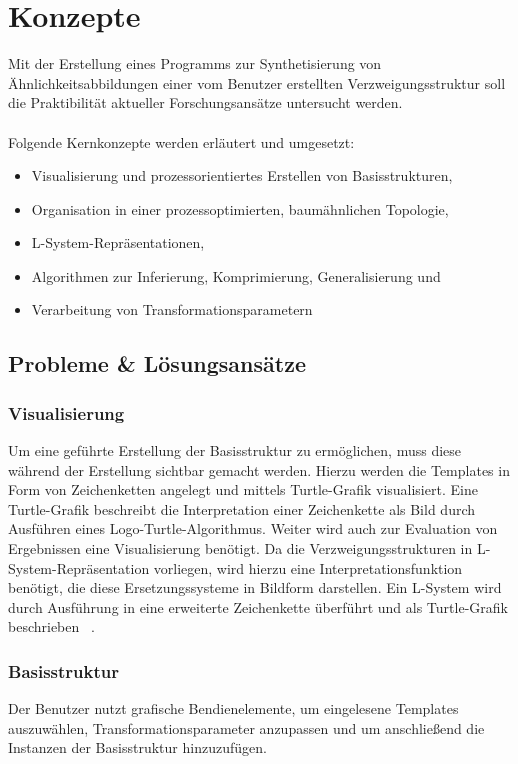 
\chapter{Konzepte}
Mit der Erstellung eines Programms zur Synthetisierung von Ähnlichkeitsabbildungen einer vom Benutzer
erstellten Verzweigungsstruktur soll die Praktibilität aktueller Forschungsansätze untersucht werden.
\\~\\
Folgende Kernkonzepte werden erläutert und umgesetzt:
\begin{itemize}
    \item Visualisierung und prozessorientiertes Erstellen von Basisstrukturen,
    \item Organisation in einer prozessoptimierten, baumähnlichen Topologie,
    \item L-System-Repräsentationen,
    \item Algorithmen zur Inferierung, Komprimierung, Generalisierung und
    \item Verarbeitung von Transformationsparametern
\end{itemize}

\section{Probleme \& Lösungsansätze}

\subsection*{Visualisierung}
Um eine geführte Erstellung der Basisstruktur zu ermöglichen, muss diese während der Erstellung sichtbar gemacht werden.
Hierzu werden die Templates in Form von Zeichenketten angelegt und mittels Turtle-Grafik visualisiert.
Eine Turtle-Grafik beschreibt die Interpretation einer Zeichenkette als Bild durch Ausführen eines Logo-Turtle-Algorithmus.
Weiter wird auch zur Evaluation von Ergebnissen eine Visualisierung benötigt.
Da die Verzweigungsstrukturen in L-System-Repräsentation vorliegen, wird hierzu eine Interpretationsfunktion benötigt,
die diese Ersetzungssysteme in Bildform darstellen.
Ein L-System wird durch Ausführung in eine erweiterte Zeichenkette überführt und als Turtle-Grafik beschrieben
~\cite{prusinkiewicz_1986}.

\subsection*{Basisstruktur}
Der Benutzer nutzt grafische Bendienelemente, um eingelesene Templates auszuwählen, Transformationsparameter anzupassen
und um anschließend die Instanzen der Basisstruktur hinzuzufügen.

